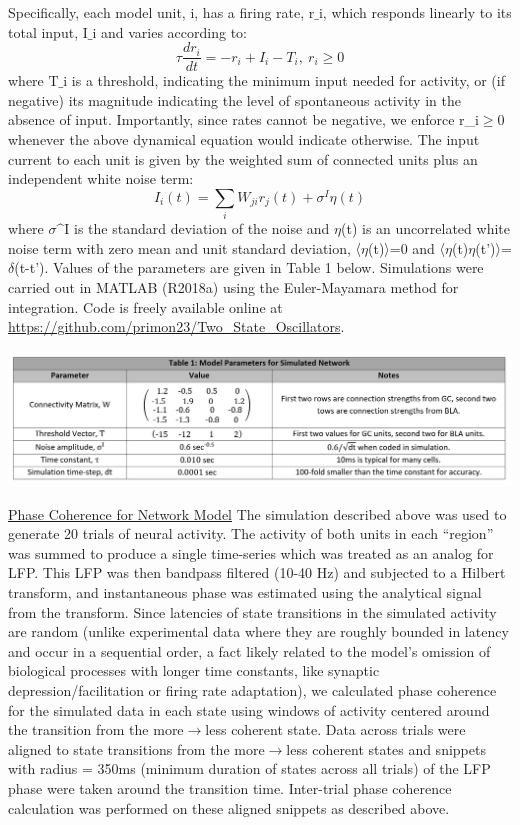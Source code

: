 \begin{refsection}
Specifically, each model unit, i,  has a firing rate, $\text{r_i}$, which responds linearly to its total input, $\text{I_i}$ and varies according to:
$$\tau \frac{dr_i}{dt}=-r_i+I_i-T_i,\ r_i\ge0$$
where $\text{T_i}$ is a threshold, indicating the minimum input needed for activity, or (if negative) its magnitude indicating the level of spontaneous activity in the absence of input. Importantly, since rates cannot be negative, we enforce r_i$\ge$0 whenever the above dynamical equation would indicate otherwise. The input current to each unit is given by the weighted sum of connected units plus an independent white noise term:
$$I_i (t)=\sum_{i}W_{ji} r_j (t)+\sigma^I \eta(t)$$
where $\sigma\text{^I}$ is the standard deviation of the noise and $\eta$(t) is an uncorrelated white noise term with zero mean and unit standard deviation, 〈$\eta$(t)〉=0 and 〈$\eta$(t)$\eta$(t')〉=$\delta$(t-t').
Values of the parameters are given in Table 1 below. Simulations were carried out in MATLAB (R2018a) using the Euler-Mayamara method for integration. Code is freely available online at \url{https://github.com/primon23/Two_State_Oscillators}.

\begin{tabular}
\centering
    \includegraphics[width=\linewidth]{mahmood_22_figures/table1.PNG}
\end{tabular}
\noindent\underline{Phase Coherence for Network Model}
The simulation described above was used to generate 20 trials of neural activity. The activity of both units in each “region” was summed to produce a single time-series which was treated as an analog for LFP. This LFP was then bandpass filtered (10-40 Hz) and subjected to a Hilbert transform, and instantaneous phase was estimated using the analytical signal from the transform. Since latencies of state transitions in the simulated activity are random (unlike experimental data where they are roughly bounded in latency and occur in a sequential order, a fact likely related to the model’s omission of biological processes with longer time constants, like synaptic depression/facilitation or firing rate adaptation), we calculated phase coherence for the simulated data in each state using windows of activity centered around the transition from the more$\rightarrow$less coherent state. Data across trials were aligned to state transitions from the more$\rightarrow$less coherent states and snippets with radius = 350ms (minimum duration of states across all trials) of the LFP phase were taken around the transition time. Inter-trial phase coherence calculation was performed on these aligned snippets as described above.


\end{refsection}
